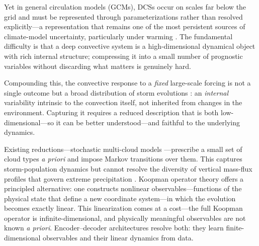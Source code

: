 \documentclass[11pt]{article}
\begin{document}
Yet in general circulation models (GCMs), DCSs occur on scales far below the grid and must be represented through parameterizations rather than resolved explicitly---a representation that remains one of the most persistent sources of climate-model uncertainty, particularly under warming \citep{yang2023impact, bolot2025no}. The fundamental difficulty is that a deep convective system is a high-dimensional dynamical object with rich internal structure; compressing it into a small number of prognostic variables without discarding what matters is genuinely hard.

Compounding this, the convective response to a \emph{fixed} large-scale forcing is not a single outcome but a broad distribution of storm evolutions \citep{abramian2025key, feng2025mesoscale, hu2020observed, fiolleau2024database}: an \emph{internal} variability intrinsic to the convection itself, not inherited from changes in the environment. Capturing it requires a reduced description that is both low-dimensional---so it can be better understood---and faithful to the underlying dynamics.

Existing reductions---stochastic multi-cloud models \citep{khouider2006multicloud, majda2008stochastic, khouider2010stochastic}---prescribe a small set of cloud types \emph{a priori} and impose Markov transitions over them. This captures storm-population dynamics but cannot resolve the diversity of vertical mass-flux profiles that govern extreme precipitation \citep{MullerYukari19, singh2012upward, abramian2023extreme, wang2022convective, li2025bimodal}. Koopman operator theory \citep{koopman1931hamiltonian, brunton2021modern} offers a principled alternative: one constructs nonlinear observables---functions of the physical state that define a new coordinate system---in which the evolution becomes exactly linear. This linearization comes at a cost---the full Koopman operator is infinite-dimensional, and physically meaningful observables are not known \emph{a priori}. Encoder--decoder architectures \citep{lusch2018deep, nathaniel2026generative} resolve both: they learn finite-dimensional observables and their linear dynamics from data.
\end{document}
